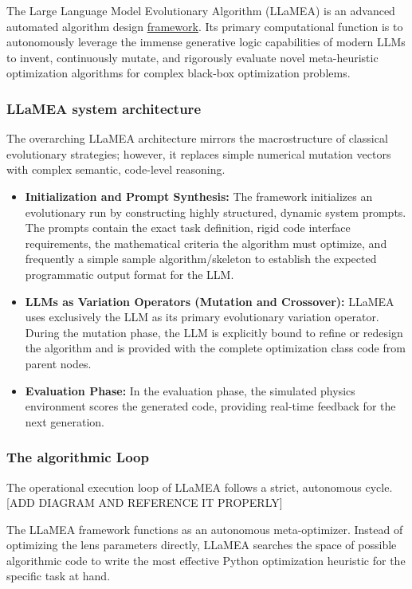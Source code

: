 \documentclass[12pt]{article}
\begin{document}
The Large Language Model Evolutionary Algorithm (LLaMEA) is an advanced automated algorithm design \href{https://github.com/XAI-liacs/LLaMEA}{framework}. Its primary computational function is to autonomously leverage the immense generative logic capabilities of modern LLMs to invent, continuously mutate, and rigorously evaluate novel meta-heuristic optimization algorithms for complex black-box optimization problems.

\subsubsection{LLaMEA system architecture}
The overarching LLaMEA architecture mirrors the macrostructure of classical evolutionary strategies; however, it replaces simple numerical mutation vectors with complex semantic, code-level reasoning. 
\begin{itemize}
    \item \textbf{Initialization and Prompt Synthesis:} The framework initializes an evolutionary run by constructing highly structured, dynamic system prompts. The prompts contain the exact task definition, rigid code interface requirements, the mathematical criteria the algorithm must optimize, and frequently a simple sample algorithm/skeleton to establish the expected programmatic output format for the LLM. 
    \item \textbf{LLMs as Variation Operators (Mutation and Crossover):} LLaMEA uses exclusively the LLM as its primary evolutionary variation operator. During the mutation phase, the LLM is explicitly bound to refine or redesign the algorithm and is provided with the complete optimization class code from parent nodes.
    \item \textbf{Evaluation Phase:} In the evaluation phase, the simulated physics environment scores the generated code, providing real-time feedback for the next generation.
\end{itemize}


\subsubsection{The algorithmic Loop}
The operational execution loop of LLaMEA follows a strict, autonomous cycle. [ADD DIAGRAM AND REFERENCE IT PROPERLY]

The LLaMEA framework functions as an autonomous meta-optimizer. Instead of optimizing the lens parameters directly, LLaMEA searches the space of possible algorithmic code to write the most effective Python optimization heuristic for the specific task at hand.
\end{document}

